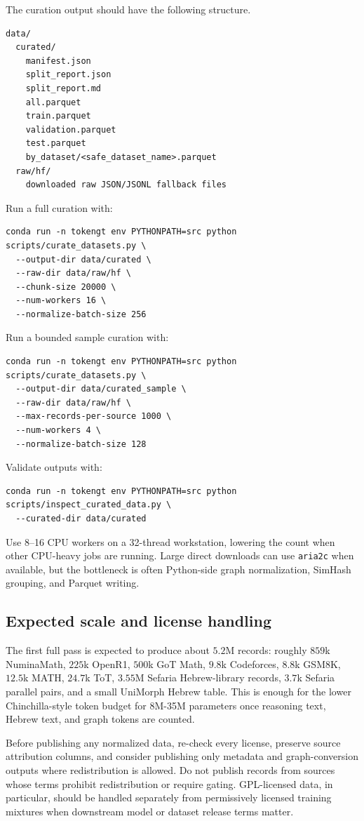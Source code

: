 \documentclass[11pt]{article}
\theoremstyle{definition}
\theoremstyle{plain}
\theoremstyle{remark}
\numberwithin{equation}{section}
\begin{document}
The curation output should have the following structure.
\begin{verbatim}
data/
  curated/
    manifest.json
    split_report.json
    split_report.md
    all.parquet
    train.parquet
    validation.parquet
    test.parquet
    by_dataset/<safe_dataset_name>.parquet
  raw/hf/
    downloaded raw JSON/JSONL fallback files
\end{verbatim}
Run a full curation with:
\begin{verbatim}
conda run -n tokengt env PYTHONPATH=src python scripts/curate_datasets.py \
  --output-dir data/curated \
  --raw-dir data/raw/hf \
  --chunk-size 20000 \
  --num-workers 16 \
  --normalize-batch-size 256
\end{verbatim}
Run a bounded sample curation with:
\begin{verbatim}
conda run -n tokengt env PYTHONPATH=src python scripts/curate_datasets.py \
  --output-dir data/curated_sample \
  --raw-dir data/raw/hf \
  --max-records-per-source 1000 \
  --num-workers 4 \
  --normalize-batch-size 128
\end{verbatim}
Validate outputs with:
\begin{verbatim}
conda run -n tokengt env PYTHONPATH=src python scripts/inspect_curated_data.py \
  --curated-dir data/curated
\end{verbatim}
Use 8--16 CPU workers on a 32-thread workstation, lowering the count when other CPU-heavy jobs are running.  Large direct downloads can use \texttt{aria2c} when available, but the bottleneck is often Python-side graph normalization, SimHash grouping, and Parquet writing.

\subsection{Expected scale and license handling}

The first full pass is expected to produce about $5.2$M records: roughly $859$k NuminaMath, $225$k OpenR1, $500$k GoT Math, $9.8$k Codeforces, $8.8$k GSM8K, $12.5$k MATH, $24.7$k ToT, $3.55$M Sefaria Hebrew-library records, $3.7$k Sefaria parallel pairs, and a small UniMorph Hebrew table.  This is enough for the lower Chinchilla-style token budget for 8M-35M parameters once reasoning text, Hebrew text, and graph tokens are counted.

Before publishing any normalized data, re-check every license, preserve source attribution columns, and consider publishing only metadata and graph-conversion outputs where redistribution is allowed.  Do not publish records from sources whose terms prohibit redistribution or require gating.  GPL-licensed data, in particular, should be handled separately from permissively licensed training mixtures when downstream model or dataset release terms matter.
\end{document}
